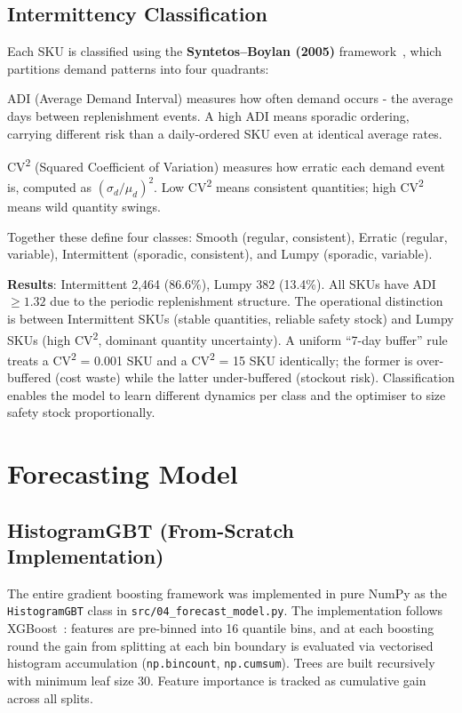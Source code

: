 \documentclass[11pt,letterpaper]{article}
\begin{document}
\subsection{Intermittency Classification}

Each SKU is classified using the \textbf{Syntetos--Boylan (2005)} framework~\cite{syntetos2005accuracy}, which partitions demand patterns into four quadrants:

ADI (Average Demand Interval) measures how often demand occurs - the average days between replenishment events. A high ADI means sporadic ordering, carrying different risk than a daily-ordered SKU even at identical average rates.

CV\textsuperscript{2} (Squared Coefficient of Variation) measures how erratic each demand event is, computed as $(\sigma_d / \mu_d)^2$. Low CV\textsuperscript{2} means consistent quantities; high CV\textsuperscript{2} means wild quantity swings.

Together these define four classes: Smooth (regular, consistent), Erratic (regular, variable), Intermittent (sporadic, consistent), and Lumpy (sporadic, variable).

\textbf{Results}: Intermittent 2,464 (86.6\%), Lumpy 382 (13.4\%). All SKUs have ADI $\geq 1.32$ due to the periodic replenishment structure. The operational distinction is between Intermittent SKUs (stable quantities, reliable safety stock) and Lumpy SKUs (high CV\textsuperscript{2}, dominant quantity uncertainty). A uniform ``7-day buffer'' rule treats a CV\textsuperscript{2} = 0.001 SKU and a CV\textsuperscript{2} = 15 SKU identically; the former is over-buffered (cost waste) while the latter under-buffered (stockout risk). Classification enables the model to learn different dynamics per class and the optimiser to size safety stock proportionally.


\section{Forecasting Model}
\label{sec:model}

\subsection{HistogramGBT (From-Scratch Implementation)}

The entire gradient boosting framework was implemented in pure NumPy as the \texttt{HistogramGBT} class in \texttt{src/04\_forecast\_model.py}. The implementation follows XGBoost~\cite{chen2016xgboost}: features are pre-binned into 16 quantile bins, and at each boosting round the gain from splitting at each bin boundary is evaluated via vectorised histogram accumulation (\texttt{np.bincount}, \texttt{np.cumsum}). Trees are built recursively with minimum leaf size 30. Feature importance is tracked as cumulative gain across all splits.
\end{document}
